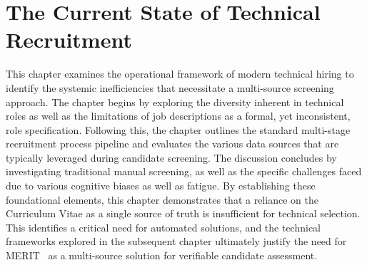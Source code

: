 \chapter{The Current State of Technical Recruitment}

This chapter examines the operational framework of modern technical hiring to identify the systemic inefficiencies that necessitate a multi-source screening approach.
The chapter begins by exploring the diversity inherent in technical roles as well as the limitations of job descriptions as a formal, yet inconsistent, role specification.
Following this, the chapter outlines the standard multi-stage recruitment process pipeline and evaluates the various data sources that are typically leveraged during candidate screening.
The discussion concludes by investigating traditional manual screening, as well as the specific challenges faced due to various cognitive biases as well as fatigue.
By establishing these foundational elements, this chapter demonstrates that a reliance on the Curriculum Vitae as a single source of truth is insufficient for technical selection.
This identifies a critical need for automated solutions, and the technical frameworks explored in the subsequent chapter ultimately justify the need for MERIT~\cite{merit_repo} as a multi-source solution for verifiable candidate assessment.








